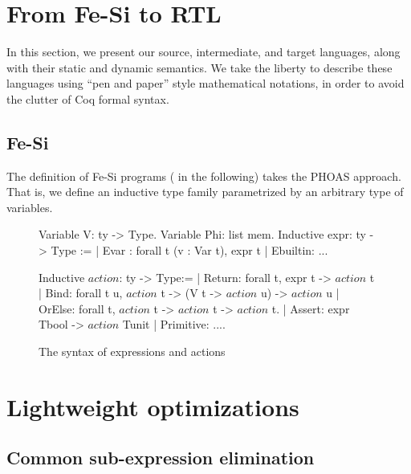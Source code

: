 \documentclass[preprint]{sigplanconf}
\newcommand{\action}{action}
\begin{document}
\section{From Fe-Si to RTL}
In this section, we present our source, intermediate, and target
languages, along with their static and dynamic semantics.
%
We take the liberty to describe these languages using ``pen and
paper'' style mathematical notations, in order to avoid the clutter of
Coq formal syntax.

\subsection{Fe-Si}
The definition of Fe-Si programs ( in the following)
takes the PHOAS approach. 
%
That is, we define an inductive type family parametrized by an
arbitrary type  of variables. 
\begin{figure}
  \centering
\begin{coq}
Variable V: ty -> Type. 
Variable Phi: list mem. 
Inductive expr: ty -> Type :=
| Evar : forall t (v : Var t), expr t
| Ebuiltin: ... 

Inductive $\action$: ty -> Type:=
| Return: forall t, expr t -> $\action$ t
| Bind: forall t u,  $\action$  t -> (V t -> $\action$ u) -> $\action$ u
| OrElse: forall t, $\action$ t -> $\action$ t -> $\action$ t.
| Assert: expr Tbool -> $\action$ Tunit    
| Primitive: ....
\end{coq}
  \caption{The syntax of expressions and actions}
  \label{fig:fesi}
\end{figure}


\section{Lightweight optimizations}
\subsection{Common sub-expression elimination}
\end{document}
